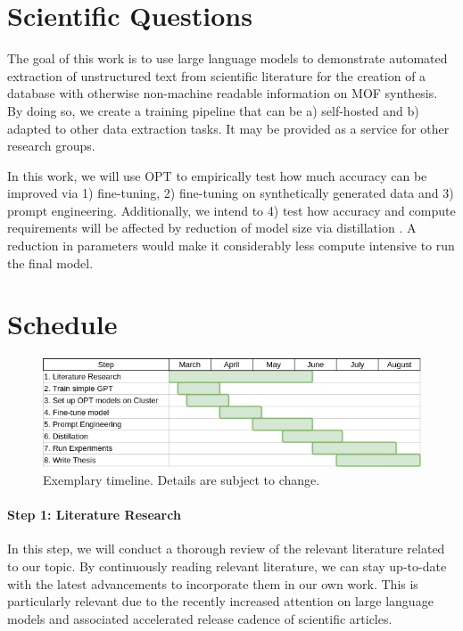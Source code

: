 \documentclass[a4paper,11pt]{article}
\newcommand{\margtodo}                                 %
{\marginpar{\textbf{\textcolor{red}{ToDo}}}{}}
\newcommand{\todo}[1]
{{\textbf{\textcolor{red}{[\margtodo{}#1]}}}{}}   %
\begin{document}

\section{Scientific Questions}
The goal of this work is to use large language models to demonstrate automated
extraction of unstructured text from scientific literature for the creation of
a database with otherwise non-machine readable information on MOF synthesis. By
doing so, we create a training pipeline that can be a) self-hosted and b)
adapted to other data extraction tasks. It may be provided as a service for
other research groups.

In this work, we will use OPT \cite{zhang_opt_2022} to empirically test how
much accuracy can be improved via 1) fine-tuning, 2) fine-tuning on
synthetically generated data and 3) prompt engineering.
Additionally, we intend to 4) test how accuracy and compute requirements will be
affected by reduction of model size via distillation \cite{sun_patient_2019}.
A reduction in parameters would make it considerably less compute intensive to
run the final model.


\section{Schedule}
\begin{figure}[ht!]
    \includegraphics[width=\textwidth]{img/thesis_gantt}
    \caption{Exemplary timeline. Details are subject to change.}
\end{figure}


\paragraph{Step 1: Literature Research}
In this step, we will conduct a thorough review of the relevant literature
related to our topic. By continuously reading relevant literature, we can
stay up-to-date with the latest advancements to incorporate them in our own
work. This is particularly relevant due to the recently increased attention
on large language models and associated accelerated release cadence of
scientific articles.
\end{document}
